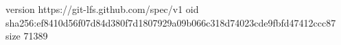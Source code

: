 version https://git-lfs.github.com/spec/v1
oid sha256:ef8410d56f07d84d380f7d1807929a09b066c318d74023cde9fbfd47412ccc87
size 71389
